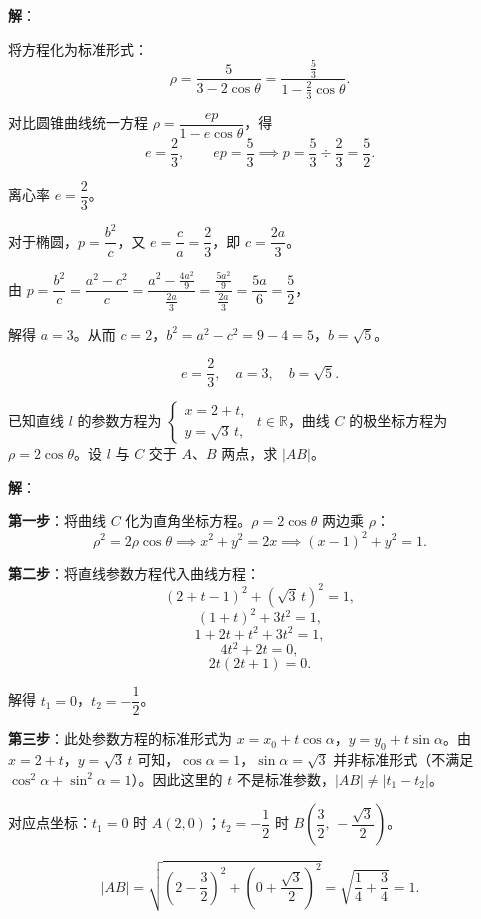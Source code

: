 \documentclass[12pt,a4paper]{ctexart}
\theoremstyle{definition}
\begin{document}
\textbf{解}：

将方程化为标准形式：
\[
  \rho = \frac{5}{3-2\cos\theta} = \frac{\frac{5}{3}}{1-\frac{2}{3}\cos\theta}.
\]

对比圆锥曲线统一方程 $\rho = \dfrac{ep}{1-e\cos\theta}$，得
\[
  e = \frac{2}{3}, \qquad ep = \frac{5}{3} \implies p = \frac{5}{3}\div\frac{2}{3} = \frac{5}{2}.
\]

离心率 $e = \dfrac{2}{3}$。

对于椭圆，$p = \dfrac{b^2}{c}$，又 $e = \dfrac{c}{a} = \dfrac{2}{3}$，即 $c = \dfrac{2a}{3}$。

由 $p = \dfrac{b^2}{c} = \dfrac{a^2-c^2}{c} = \dfrac{a^2 - \frac{4a^2}{9}}{\frac{2a}{3}} = \dfrac{\frac{5a^2}{9}}{\frac{2a}{3}} = \dfrac{5a}{6} = \dfrac{5}{2}$，

解得 $a = 3$。从而 $c = 2$，$b^2 = a^2-c^2 = 9-4 = 5$，$b = \sqrt{5}$。

\[
  \boxed{e = \frac{2}{3},\quad a = 3,\quad b = \sqrt{5}.}
\]

\begin{example}
  已知直线 $l$ 的参数方程为 $\begin{cases} x = 2+t, \\ y = \sqrt{3}\,t, \end{cases}$ $t\in\mathbb{R}$，曲线 $C$ 的极坐标方程为 $\rho=2\cos\theta$。设 $l$ 与 $C$ 交于 $A$、$B$ 两点，求 $|AB|$。
\end{example}

\textbf{解}：

\textbf{第一步}：将曲线 $C$ 化为直角坐标方程。$\rho=2\cos\theta$ 两边乘 $\rho$：
\[
  \rho^2 = 2\rho\cos\theta \implies x^2+y^2 = 2x \implies (x-1)^2+y^2=1.
\]

\textbf{第二步}：将直线参数方程代入曲线方程：
\[
  (2+t-1)^2 + (\sqrt{3}\,t)^2 = 1,
\]
\[
  (1+t)^2 + 3t^2 = 1,
\]
\[
  1+2t+t^2+3t^2 = 1,
\]
\[
  4t^2 + 2t = 0,
\]
\[
  2t(2t+1) = 0.
\]

解得 $t_1 = 0$，$t_2 = -\dfrac{1}{2}$。

\textbf{第三步}：此处参数方程的标准形式为 $x=x_0+t\cos\alpha$，$y=y_0+t\sin\alpha$。由 $x=2+t$，$y=\sqrt{3}\,t$ 可知，$\cos\alpha=1$，$\sin\alpha=\sqrt{3}$ 并非标准形式（不满足 $\cos^2\alpha+\sin^2\alpha=1$）。因此这里的 $t$ 不是标准参数，$|AB| \neq |t_1-t_2|$。

对应点坐标：$t_1=0$ 时 $A(2,0)$；$t_2=-\dfrac{1}{2}$ 时 $B\!\left(\dfrac{3}{2},\,-\dfrac{\sqrt{3}}{2}\right)$。

\[
  |AB| = \sqrt{\left(2-\frac{3}{2}\right)^2 + \left(0+\frac{\sqrt{3}}{2}\right)^2} = \sqrt{\frac{1}{4}+\frac{3}{4}} = \boxed{1}.
\]
\end{document}
